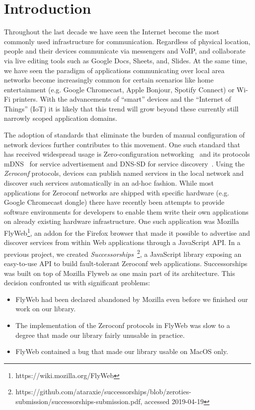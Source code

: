 \section{Introduction}
\label{sec:introduction}

Throughout the last decade we have seen the Internet become the most commonly used infrastructure for communication. Regardless of physical location, people and their devices communicate via messengers and VoIP, and collaborate via live editing tools such as Google Docs, Sheets, and, Slides. 
At the same time, we have seen the paradigm of applications communicating over local area networks become increasingly common for certain scenarios like home entertainment (e.g. Google Chromecast, Apple Bonjour, Spotify Connect) or Wi-Fi printers. 
With the advancements of ``smart'' devices and the ``Internet of Things'' (IoT) it is likely that this trend will grow beyond these currently still narrowly scoped application domains.

The adoption of standards that eliminate the burden of manual configuration of network devices further contributes to this movement. One such standard that has received widespread usage is Zero-configuration networking~\cite{guttman_2001} and its protocols mDNS~\cite{cheshire_2013_mdns} for service advertisement and DNS-SD for service discovery~\cite{cheshire_2013_dnssd}.
Using the \textit{Zeroconf} protocols, devices can publish named services in the local network and discover such services automatically in an ad-hoc fashion.
While most applications for Zeroconf networks are shipped with specific hardware (e.g. Google Chromecast dongle) there have recently been attempts to provide software environments for developers to enable them write their own applications on already existing hardware infrastructure.
One such application was Mozilla FlyWeb\footnote{https://wiki.mozilla.org/FlyWeb}, an addon for the Firefox browser that made it possible to advertise and discover services from within Web applications through a JavaScript API.
In a previous project, we created \textit{Successorships}~\footnote{https://github.com/ataraxie/successorships/blob/zeroties-submission/successorships-submission.pdf, accessed 2019-04-19}, a JavaScript library exposing an easy-to-use API to build fault-tolerant Zeroconf web applications.
Successorships was built on top of Mozilla Flyweb as one main part of its architecture.
This decision confronted us with significant problems:
\begin{itemize}
    \item FlyWeb had been declared abandoned by Mozilla even before we finished our work on our library.
    \item The implementation of the Zeroconf protocols in FlyWeb was slow to a degree that made our library fairly unusable in practice.
    \item FlyWeb contained a bug that made our library usable on MacOS only.
\end{itemize}


